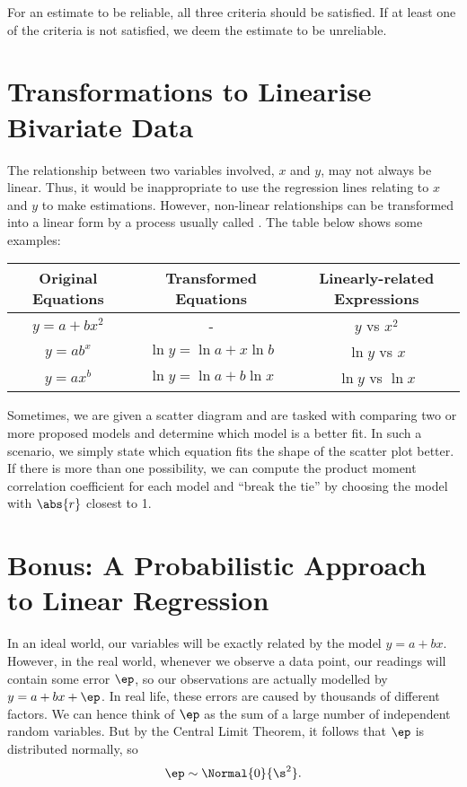 For an estimate to be reliable, all three criteria should be satisfied. If at least one of the criteria is not satisfied, we deem the estimate to be unreliable.

\section{Transformations to Linearise Bivariate Data}

The relationship between two variables involved, $x$ and $y$, may not always be linear. Thus, it would be inappropriate to use the regression lines relating to $x$ and $y$ to make estimations. However, non-linear relationships can be transformed into a linear form by a process usually called . The table below shows some examples:

\begin{table}[H]
    \centering
    \begin{tabular}{|c|c|c|}
        \hline
        \textbf{Original Equations} & \textbf{Transformed Equations} & \textbf{Linearly-related Expressions} \\ \hline
        $y = a + bx^2$ & - & $y$ vs $x^2$ \\ \hline
        $y = ab^x$ & $\ln y = \ln a + x \ln b$ & $\ln y$ vs $x$ \\ \hline
        $y = ax^b$ & $\ln y = \ln a + b \ln x$ & $\ln y$ vs $\ln x$ \\ \hline
    \end{tabular}
\end{table}

Sometimes, we are given a scatter diagram and are tasked with comparing two or more proposed models and determine which model is a better fit. In such a scenario, we simply state which equation fits the shape of the scatter plot better. If there is more than one possibility, we can compute the product moment correlation coefficient for each model and ``break the tie'' by choosing the model with $\abs{r}$ closest to 1.

\section{Bonus: A Probabilistic Approach to Linear Regression}

In an ideal world, our variables will be exactly related by the model $y = a + bx$. However, in the real world, whenever we observe a data point, our readings will contain some error $\ep$, so our observations are actually modelled by $y = a + bx + \ep$. In real life, these errors are caused by thousands of different factors. We can hence think of $\ep$ as the sum of a large number of independent random variables. But by the Central Limit Theorem, it follows that $\ep$ is distributed normally, so \[\ep \sim \Normal{0}{\s^2}.\]


